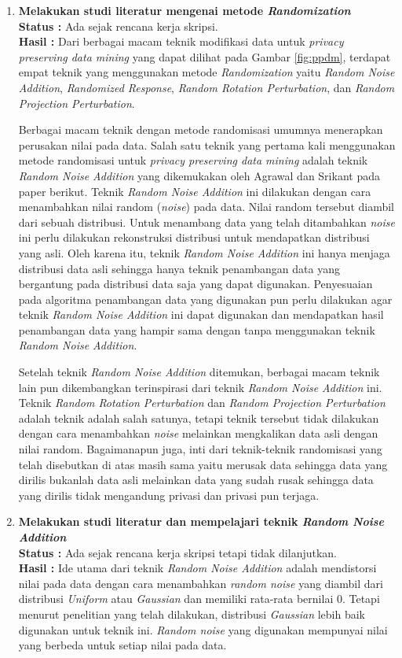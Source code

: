 \documentclass[a4paper,twoside]{article}
\begin{document}
\begin{enumerate}
		\item \textbf{Melakukan studi literatur mengenai metode \textit{Randomization}}\\
		{\bf Status :} Ada sejak rencana kerja skripsi.\\
		{\bf Hasil :} Dari berbagai macam teknik modifikasi data untuk \textit{privacy preserving data mining} yang dapat dilihat pada Gambar \ref{fig:ppdm}, terdapat empat teknik yang menggunakan metode \textit{Randomization} yaitu \textit{Random Noise Addition}, \textit{Randomized Response}, \textit{Random Rotation Perturbation}, dan \textit{Random Projection Perturbation}.

		Berbagai macam teknik dengan metode randomisasi umumnya menerapkan perusakan nilai pada data. Salah satu teknik yang pertama kali menggunakan metode randomisasi untuk \textit{privacy preserving data mining} adalah teknik \textit{Random Noise Addition} yang dikemukakan oleh Agrawal dan Srikant pada paper berikut. Teknik \textit{Random Noise Addition} ini dilakukan dengan cara menambahkan nilai random (\textit{noise}) pada data. Nilai random tersebut diambil dari sebuah distribusi. Untuk menambang data yang telah ditambahkan \textit{noise} ini perlu dilakukan rekonstruksi distribusi untuk mendapatkan distribusi yang asli. Oleh karena itu, teknik \textit{Random Noise Addition} ini hanya menjaga distribusi data asli sehingga hanya teknik penambangan data yang bergantung pada distribusi data saja yang dapat digunakan. Penyesuaian pada algoritma penambangan data yang digunakan pun perlu dilakukan agar teknik \textit{Random Noise Addition} ini dapat digunakan dan mendapatkan hasil penambangan data yang hampir sama dengan tanpa menggunakan teknik \textit{Random Noise Addition}.
		
		Setelah teknik \textit{Random Noise Addition} ditemukan, berbagai macam teknik lain pun dikembangkan terinspirasi dari teknik \textit{Random Noise Addition} ini. Teknik \textit{Random Rotation Perturbation} dan \textit{Random Projection Perturbation} adalah teknik adalah salah satunya, tetapi teknik tersebut tidak dilakukan dengan cara menambahkan \textit{noise} melainkan mengkalikan data asli dengan nilai random. Bagaimanapun juga, inti dari teknik-teknik randomisasi yang telah disebutkan di atas masih sama yaitu merusak data sehingga data yang dirilis bukanlah data asli melainkan data yang sudah rusak sehingga data yang dirilis tidak mengandung privasi dan privasi pun terjaga.
		
		\item \textbf{Melakukan studi literatur dan mempelajari teknik \textit{Random Noise Addition}}\\
		{\bf Status :} Ada sejak rencana kerja skripsi tetapi tidak dilanjutkan.\\
		{\bf Hasil :} Ide utama dari teknik \textit{Random Noise Addition} adalah mendistorsi nilai pada data dengan cara menambahkan \textit{random noise} yang diambil dari distribusi \textit{Uniform} atau \textit{Gaussian} dan memiliki rata-rata bernilai 0. Tetapi menurut penelitian yang telah dilakukan, distribusi \textit{Gaussian} lebih baik digunakan untuk teknik ini. \textit{Random noise} yang digunakan mempunyai nilai yang berbeda untuk setiap nilai pada data.


\end{enumerate}
\end{document}
